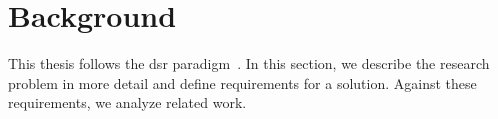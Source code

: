 \section{Background }
\label{sec:bpm2017background}
This thesis follows the \gls{dsr} paradigm~\cite{Peffers2008}. In this section, we describe the research problem in more detail and define requirements for a solution. Against these requirements, we analyze related work.





%
